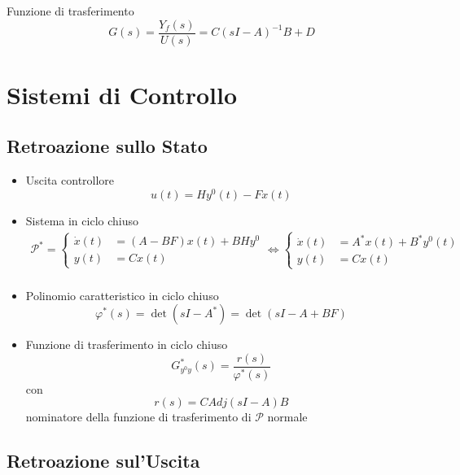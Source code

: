 \documentclass{article}
\begin{document}
Funzione di trasferimento
\[G(s) = \frac{Y_f(s)}{U(s)} = C(sI-A)^{-1}B + D\]

\section{Sistemi di Controllo}

\subsection{Retroazione sullo Stato}

\begin{itemize}
\item Uscita controllore
  \[ u(t) = Hy^{0}(t) - Fx(t) \]
\item Sistema in ciclo chiuso
  \begin{align*}
    \mathcal{P}^{\ast} = \begin{cases}
      \dot{x}(t) &= (A-BF)x(t) + BHy^{0} \\
      y(t) &= Cx(t)
    \end{cases} \iff
    \begin{cases}
      \dot{x}(t) &= A^{\ast}x(t) + B^{\ast}y^{0}(t) \\
      y(t) &= Cx(t)
    \end{cases} \\
  \end{align*}
\item Polinomio caratteristico in ciclo chiuso
  \[ \varphi ^{\ast}(s) = \det(sI - A^{\ast}) = \det(sI - A + BF) \]%
\item Funzione di trasferimento in ciclo chiuso
  \[ G^{\ast}_{y^0 y} (s) = \frac{r(s)}{\varphi ^{\ast} (s)} \]
  con
  \[ r(s) = C Adj(sI-A)B \]
  nominatore della funzione di trasferimento di $\mathcal{P}$ normale
\end{itemize}

\subsection{Retroazione sul'Uscita}
\end{document}
